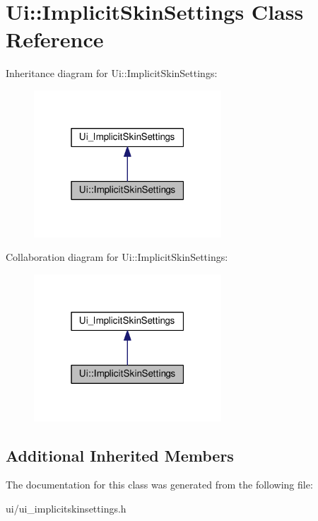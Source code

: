 \hypertarget{classUi_1_1ImplicitSkinSettings}{}\section{Ui\+:\+:Implicit\+Skin\+Settings Class Reference}
\label{classUi_1_1ImplicitSkinSettings}


Inheritance diagram for Ui\+:\+:Implicit\+Skin\+Settings\+:
\nopagebreak
\begin{figure}[H]
\begin{center}
\leavevmode
\includegraphics[width=199pt]{d5/df1/classUi_1_1ImplicitSkinSettings__inherit__graph}
\end{center}
\end{figure}


Collaboration diagram for Ui\+:\+:Implicit\+Skin\+Settings\+:
\nopagebreak
\begin{figure}[H]
\begin{center}
\leavevmode
\includegraphics[width=199pt]{db/dc5/classUi_1_1ImplicitSkinSettings__coll__graph}
\end{center}
\end{figure}
\subsection*{Additional Inherited Members}


The documentation for this class was generated from the following file\+:\begin{DoxyCompactItemize}
\item 
ui/ui\+\_\+implicitskinsettings.\+h\end{DoxyCompactItemize}
